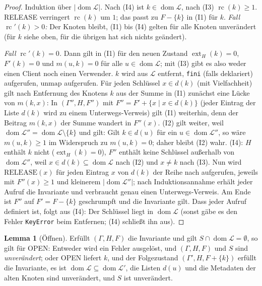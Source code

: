 \documentclass[a4paper,12pt,twoside]{report}
\DeclareRobustCommand{\_}{\ifmmode\mbox{\textunderscore}\else\textunderscore\allowbreak{}\fi}
\theoremstyle{definition}
\newtheorem{lemma}{Lemma}[chapter]
\newcommand{\dom}{\operatorname{dom}}
\newcommand{\ext}{\operatorname{ext}}
\newcommand{\rc}{\operatorname{rc}}
\begin{document}
\begin{proof}
	Induktion über $|\dom\mathcal L|$. Nach (I4) ist $k\in\dom\mathcal L$, nach (I3) $\rc(k)\ge1$. RELEASE verringert $\rc(k)$ um $1$; das passt zu $F-\{k\}$ in (I1) für $k$. \emph{Fall $\rc'(k)>0$:} Der Knoten bleibt, (I1) bis (I4) gelten für alle Knoten unverändert (für $k$ siehe oben, für die übrigen hat sich nichts geändert).

	\emph{Fall $\rc'(k)=0$.} Dann gilt in (I1) für den neuen Zustand $\ext_H(k)=0$, $F'(k)=0$ und $m(u,k)=0$ für alle $u\in\dom\mathcal L$; mit (I3) gibt es also weder einen Client noch einen Verwender. $k$ wird aus $\mathcal L$ entfernt, \texttt{fini} (falls deklariert) aufgerufen, $\mathrm{unmap}$ aufgerufen. Für jeden Schlüssel $x\in d(k)$ (mit Vielfachheit) gilt nach Entfernung des Knotens $k$ aus der Summe in (I1) zunächst eine Lücke von $m(k,x)$: In $(\Gamma'',H,F'')$ mit $F''=F'+\{x\mid x\in d(k)\}$ (jeder Eintrag der Liste $d(k)$ wird zu einem Unterwegs-Verweis) gilt (I1) weiterhin, denn der Beitrag $m(k,x)$ der Summe wandert in $F''(x)$. (I2) gilt weiter, weil $\dom\mathcal L''=\dom\mathcal L\setminus\{k\}$ und gilt: Gilt $k\in d(u)$ für ein $u\in\dom\mathcal L''$, so wäre $m(u,k)\ge1$ im Widerspruch zu $m(u,k)=0$; daher bleibt (I2) wahr. (I4): $H$ enthält $k$ nicht ($\ext_H(k)=0$), $F''$ enthält keine Schlüssel außerhalb von $\dom\mathcal L''$, weil $x\in d(k)\subseteq\dom\mathcal L$ nach (I2) und $x\ne k$ nach (I3). Nun wird $\mathrm{RELEASE}(x)$ für jeden Eintrag $x$ von $d(k)$ der Reihe nach aufgerufen, jeweils mit $F''(x)\ge1$ und kleinerem $|\dom\mathcal L''|$; nach Induktionsannahme erhält jeder Aufruf die Invariante und verbraucht genau einen Unterwegs-Verweis. Am Ende ist $F''$ auf $F'=F-\{k\}$ geschrumpft und die Invariante gilt. Dass jeder Aufruf definiert ist, folgt aus (I4): Der Schlüssel liegt in $\dom\mathcal L$ (sonst gäbe es den Fehler \texttt{KeyError} beim Entfernen; (I4) schließt ihn aus).
\end{proof}

\begin{lemma}[Öffnen]
	\label{lem:open}
	Erfüllt $(\Gamma,H,F)$ die Invariante und gilt $S\cap\dom\mathcal L=\emptyset$, so gilt für OPEN: Entweder wird ein Fehler ausgelöst, und $(\Gamma,H,F)$ und $S$ sind \emph{unverändert}; oder OPEN liefert $k$, und der Folgezustand $(\Gamma',H,F+\{k\})$ erfüllt die Invariante, es ist $\dom\mathcal L\subseteq\dom\mathcal L'$, die Listen $d(u)$ und die Metadaten der alten Knoten sind unverändert, und $S$ ist unverändert.
\end{lemma}
\end{document}
